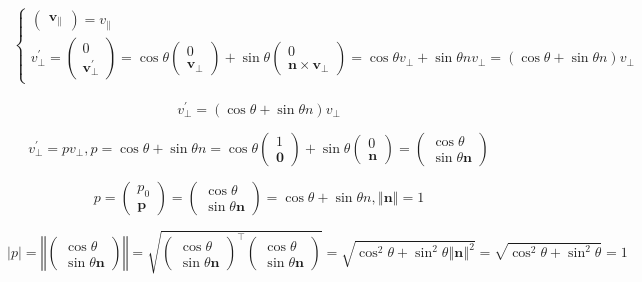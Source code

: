 \documentclass[
]{book}
\theoremstyle{definition}
\theoremstyle{definition}
\theoremstyle{definition}
\theoremstyle{definition}
\theoremstyle{remark}
\begin{document}
\[\begin{aligned}
\begin{cases}
\begin{pmatrix}
\boldsymbol{v}_{{\scriptscriptstyle \parallel}}
\end{pmatrix}=v_{{\scriptscriptstyle \parallel}}\\
v_{{\scriptscriptstyle \perp}}^{\prime}=\begin{pmatrix}0\\
\boldsymbol{v}_{{\scriptscriptstyle \perp}}^{\prime}
\end{pmatrix}=\cos\theta\begin{pmatrix}0\\
\boldsymbol{v}_{{\scriptscriptstyle \perp}}
\end{pmatrix}+\sin\theta\begin{pmatrix}0\\
\boldsymbol{n}\times\boldsymbol{v}_{{\scriptscriptstyle \perp}}
\end{pmatrix}=\cos\theta v_{{\scriptscriptstyle \perp}}+\sin\theta nv_{{\scriptscriptstyle \perp}}=\left(\cos\theta+\sin\theta n\right)v_{{\scriptscriptstyle \perp}}
\end{cases}
\end{aligned}
\]

\[
v_{{\scriptscriptstyle \perp}}^{\prime}=\left(\cos\theta+\sin\theta n\right)v_{{\scriptscriptstyle \perp}}
\]

\[
v_{{\scriptscriptstyle \perp}}^{\prime}=pv_{{\scriptscriptstyle \perp}},p=\cos\theta+\sin\theta n=\cos\theta\begin{pmatrix}1\\
\boldsymbol{0}
\end{pmatrix}+\sin\theta\begin{pmatrix}0\\
\boldsymbol{n}
\end{pmatrix}=\begin{pmatrix}\cos\theta\\
\sin\theta\boldsymbol{n}
\end{pmatrix}
\]

\[
p=\begin{pmatrix}p_{{\scriptscriptstyle 0}}\\
\boldsymbol{p}
\end{pmatrix}=\begin{pmatrix}\cos\theta\\
\sin\theta\boldsymbol{n}
\end{pmatrix}=\cos\theta+\sin\theta n,\left\Vert \boldsymbol{n}\right\Vert =1
\]

\[
\left|p\right|=\left\Vert \begin{pmatrix}\cos\theta\\
\sin\theta\boldsymbol{n}
\end{pmatrix}\right\Vert =\sqrt{\begin{pmatrix}\cos\theta\\
\sin\theta\boldsymbol{n}
\end{pmatrix}^{\intercal}\begin{pmatrix}\cos\theta\\
\sin\theta\boldsymbol{n}
\end{pmatrix}}=\sqrt{\cos^{2}\theta+\sin^{2}\theta\left\Vert \boldsymbol{n}\right\Vert ^{2}}=\sqrt{\cos^{2}\theta+\sin^{2}\theta}=1
\]
\end{document}
